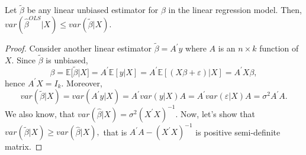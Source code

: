 \documentclass[notes=show]{beamer}
\begin{document}
\begin{frame}%


\begin{theorem}
Let $\widetilde{\beta }$ be any linear unbiased estimator for $\beta $ in
the linear regression model. Then, $var(\hat{\beta}^{OLS}|X)\leq var(%
\widetilde{\beta }|X).$
\end{theorem}

\end{frame}%

\begin{frame}%

\begin{proof}
Consider another linear estimator $\widetilde{\beta }=A^{\prime }y$ where $A$
is an $n\times k$ function of $X.$ Since $\widetilde{\beta }$ is unbiased, 
\begin{equation*}
\beta =\mathbb{E[}\widetilde{\beta }|X]=A^{\prime }\mathbb{E}\left[ y|X%
\right] =A^{\prime }\mathbb{E}\left[ \left( X\beta +\varepsilon \right) |X%
\right] =A^{\prime }X\beta ,
\end{equation*}%
hence $A^{\prime }X=I_{k}.$ Moreover, 
\begin{equation*}
var\left( \widetilde{\beta }|X\right) =var\left( A^{\prime }y|X\right)
=A^{\prime }var\left( y|X\right) A=A^{\prime }var\left( \varepsilon
|X\right) A=\sigma ^{2}A^{\prime }A.
\end{equation*}%
We also know, that $var\left( \hat{\beta}|X\right) =\sigma ^{2}(X^{\prime
}X)^{-1}.$ Now, let's show that $var\left( \widetilde{\beta }|X\right) \geq
var\left( \hat{\beta}|X\right) ,$ that is $A^{\prime }A-(X^{\prime }X)^{-1}$
is positive semi-definite matrix.
\end{proof}

\end{frame}%
\end{document}

